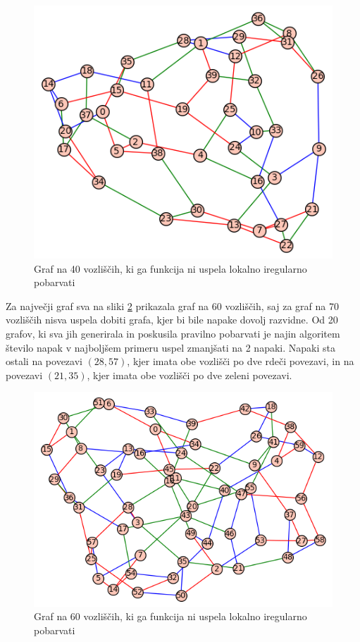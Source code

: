 \documentclass[12pt, a4paper]{article}
\begin{document}
\begin{figure}[H]
  \includegraphics[width=\linewidth]{40neuspel_pobarvan.png}
  \caption{Graf na 40 vozliščih, ki ga funkcija ni uspela lokalno iregularno pobarvati}
  \label{fig:40neuspel}
\end{figure}

Za največji graf sva na sliki \ref{fig:60neuspel} prikazala graf na 60 vozliščih, saj za graf na 70 vozliščih nisva uspela dobiti grafa, kjer bi bile napake dovolj razvidne. Od 20 grafov, ki sva jih generirala in poskusila pravilno pobarvati je najin algoritem število napak v najboljšem primeru uspel zmanjšati na 2 napaki. Napaki sta ostali na povezavi $(28, 57)$, kjer imata obe vozlišči po dve rdeči povezavi, in na povezavi $(21, 35)$, kjer imata obe vozlišči po dve zeleni povezavi.

\begin{figure}[H]
  \includegraphics[width=\linewidth]{60neuspel.png}
  \caption{Graf na 60 vozliščih, ki ga funkcija ni uspela lokalno iregularno pobarvati}
  \label{fig:60neuspel}
\end{figure}
\end{document}
